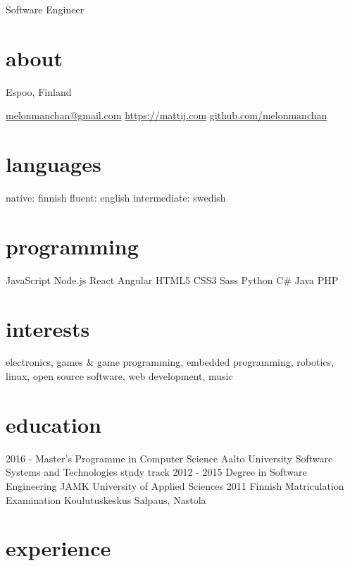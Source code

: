 \documentclass[]{friggeri-cv}
\begin{document}
       {Software Engineer}


\begin{aside}
  \section{about}
    Espoo,
    Finland
    
    \href{mailto:melonmanchan@gmail.com}{melonmanchan@gmail.com}
    \href{https://mattij.com/}{https://mattij.com}
    \href{github.com/melonmanchan}{github.com/melonmanchan}
  \section{languages}
    native: finnish
    fluent: english
    intermediate: swedish
  \section{programming}
    JavaScript
    Node.js
    React
    Angular
    HTML5
    CSS3
    Sass
    Python
    C\#
    Java
    PHP
\end{aside}

\section{interests}

electronics, games \& game programming, embedded programming, robotics, linux, open source software, web development, music

\section{education}

\begin{entrylist}
  \entry
    {2016 -}
    {Master's Programme in Computer Science}
    {Aalto University}
    {Software Systems and Technologies study track}
  \entry
    {2012 - 2015}
    {Degree in Software Engineering}
    {JAMK University of Applied Sciences}
    {}
  \entry
    {2011}
    {Finnish Matriculation Examination}
    {Koulutuskeskus Salpaus, Nastola}
    {}
\end{entrylist}

\section{experience}
\end{document}

